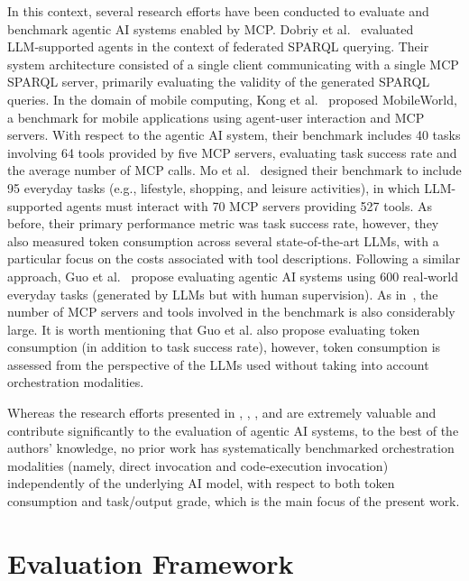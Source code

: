 \documentclass[runningheads]{llncs}
\begin{document}
In this context, several research efforts have been conducted to evaluate and benchmark agentic AI systems enabled by MCP. Dobriy et al.~\cite{dobriy2026agentic} evaluated LLM‑supported agents in the context of federated SPARQL querying. Their system architecture consisted of a single client communicating with a single MCP SPARQL server, primarily evaluating the validity of the generated SPARQL queries. In the domain of mobile computing, Kong et al.~\cite{kong2025mobileworld} proposed MobileWorld, a benchmark for mobile applications using agent-user interaction and MCP servers. With respect to the agentic AI system, their benchmark includes 40 tasks involving 64 tools provided by five MCP servers, evaluating task success rate and the average number of MCP calls. Mo et al.~\cite{mo2025livemcpbench} designed their benchmark to include 95 everyday tasks (e.g., lifestyle, shopping, and leisure activities), in which LLM-supported agents must interact with 70 MCP servers providing 527 tools. As before, their primary performance metric was task success rate, however, they also measured token consumption across several state‑of‑the‑art LLMs, with a particular focus on the costs associated with tool descriptions. Following a similar approach, Guo et al.~\cite{guo2026mcp} propose evaluating agentic AI systems using 600 real‑world everyday tasks (generated by LLMs but with human supervision). As in~\cite{mo2025livemcpbench}, the number of MCP servers and tools involved in the benchmark is also considerably large. It is worth mentioning that Guo et al. also propose evaluating token consumption (in addition to task success rate), however, token consumption is assessed from the perspective of the LLMs used without taking into account orchestration modalities. 

Whereas the research efforts presented in \cite{dobriy2026agentic}, \cite{kong2025mobileworld}, \cite{mo2025livemcpbench}, and \cite{guo2026mcp} are extremely valuable and contribute significantly to the evaluation of agentic AI systems, to the best of the authors' knowledge, no prior work has systematically benchmarked orchestration modalities (namely, direct invocation and code‑execution invocation) independently of the underlying AI model, with respect to both token consumption and task/output grade, which is the main focus of the present work.


\section{Evaluation Framework}
\label{sec:evaluation_framework}
\end{document}

